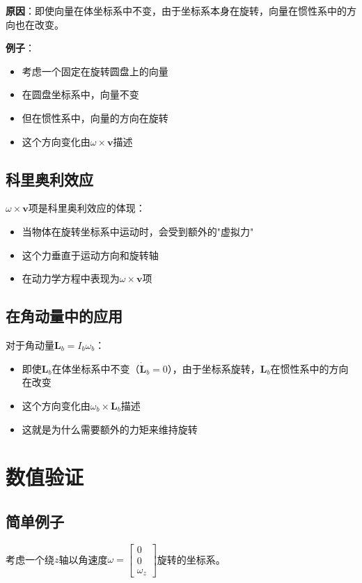 \documentclass[12pt,a4paper]{article}
\begin{document}
\textbf{原因}：即使向量在体坐标系中不变，由于坐标系本身在旋转，向量在惯性系中的方向也在改变。

\textbf{例子}：
\begin{itemize}
\item 考虑一个固定在旋转圆盘上的向量
\item 在圆盘坐标系中，向量不变
\item 但在惯性系中，向量的方向在旋转
\item 这个方向变化由$\omega \times \bm{v}$描述
\end{itemize}

\subsection{科里奥利效应}

$\omega \times \bm{v}$项是科里奥利效应的体现：
\begin{itemize}
\item 当物体在旋转坐标系中运动时，会受到额外的"虚拟力"
\item 这个力垂直于运动方向和旋转轴
\item 在动力学方程中表现为$\omega \times \bm{v}$项
\end{itemize}

\subsection{在角动量中的应用}

对于角动量$\bm{L}_b = I_b \omega_b$：
\begin{itemize}
\item 即使$\bm{L}_b$在体坐标系中不变（$\dot{\bm{L}}_b = 0$），由于坐标系旋转，$\bm{L}_b$在惯性系中的方向在改变
\item 这个方向变化由$\omega_b \times \bm{L}_b$描述
\item 这就是为什么需要额外的力矩来维持旋转
\end{itemize}

\section{数值验证}

\subsection{简单例子}

考虑一个绕$z$轴以角速度$\omega = \begin{bmatrix} 0 \\ 0 \\ \omega_z \end{bmatrix}$旋转的坐标系。
\end{document}
